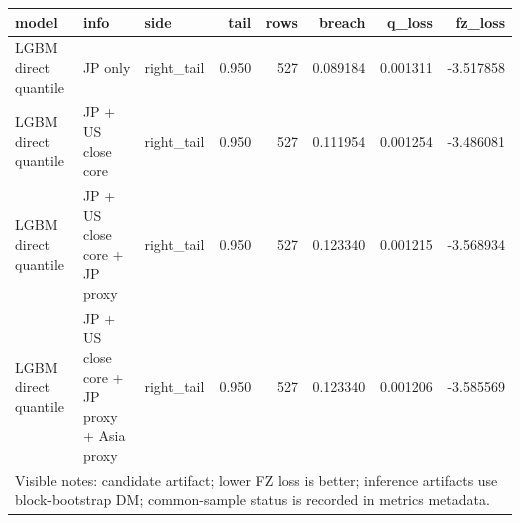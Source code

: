 \begin{tabular}{lllrrrrr}
\toprule
model & info & side & tail & rows & breach & q_loss & fz_loss \\
\midrule
LGBM direct quantile & JP only & right\_tail & 0.950 & 527 & 0.089184 & 0.001311 & -3.517858 \\
LGBM direct quantile & JP + US close core & right\_tail & 0.950 & 527 & 0.111954 & 0.001254 & -3.486081 \\
LGBM direct quantile & JP + US close core + JP proxy & right\_tail & 0.950 & 527 & 0.123340 & 0.001215 & -3.568934 \\
LGBM direct quantile & JP + US close core + JP proxy + Asia proxy & right\_tail & 0.950 & 527 & 0.123340 & 0.001206 & -3.585569 \\
\midrule
\multicolumn{8}{l}{\footnotesize Visible notes: candidate artifact; lower FZ loss is better; inference artifacts use block-bootstrap DM; common-sample status is recorded in metrics metadata.} \\
\bottomrule
\end{tabular}
